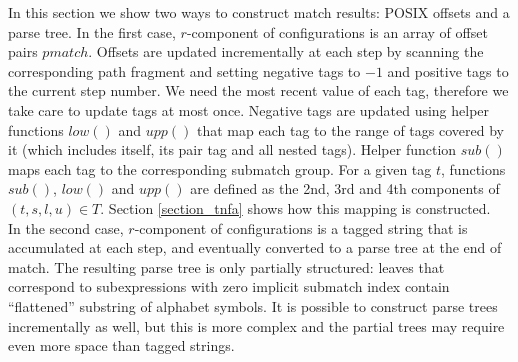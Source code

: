\documentclass[AMA,STIX1COL]{WileyNJD-v2}
\begin{document}
In this section we show two ways to construct match results: POSIX offsets and a parse tree.
%
In the first case, $r$-component of configurations is an array of offset pairs $pmatch$.
Offsets are updated incrementally at each step by scanning the corresponding path fragment
and setting negative tags to $-1$ and positive tags to the current step number.
We need the most recent value of each tag, therefore we take care to update tags at most once.
Negative tags are updated using helper functions $low()$ and $upp()$ that map each tag to the range of tags covered by it
(which includes itself, its pair tag and all nested tags).
Helper function $sub()$ maps each tag to the corresponding submatch group.
For a given tag $t$, functions $sub()$, $low()$ and $upp()$ are defined as the 2nd, 3rd and 4th components of $(t, s, l, u) \in T$.
Section \ref{section_tnfa} shows how this mapping is constructed.
\\

In the second case, $r$-component of configurations is a tagged string that is accumulated at each step,
and eventually converted to a parse tree at the end of match.
The resulting parse tree is only partially structured:
leaves that correspond to subexpressions with zero implicit submatch index contain ``flattened'' substring of alphabet symbols.
It is possible to construct parse trees incrementally as well,
but this is more complex and the partial trees may require even more space than tagged strings.
\\
\end{document}
